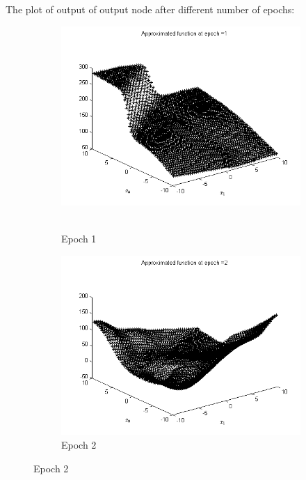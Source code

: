 \documentclass{article}
\begin{document}
The plot of output of output node after different number of epochs:

\begin{figure}
\begin{subfigure}{.5\textwidth}
  \centering
  \includegraphics[width=.8\linewidth]{Regression/bivariate/1layer_epoch_1.png}\
  \caption{Epoch 1}
\end{subfigure}%
\begin{subfigure}{.5\textwidth}
  \centering
  \includegraphics[width=.8\linewidth]{Regression/bivariate/1layer_epoch_2.png}
   \caption{Epoch 2}
  \end{subfigure}
  

\end{figure}
\end{document}
